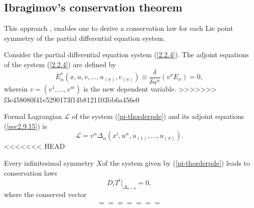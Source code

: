 \begin{defn}
\begin{defn}
\subsection{Ibragimov's conservation theorem}
This approach \citep{ibragimov2009practical}, enables one to derive a conservation law for each Lie point symmetry of the partial differential equation system.

 \begin{defn}  Consider the partial differential equation system (\ref{2.2.4}). The adjoint equations of the system (\ref{2.2.4})  are defined by \begin{equation} E_{\alpha}^{*}( x, u , v, \ldots,u_{(\pi)},v_{(\pi)}) \equiv   \frac{ \delta }{ \delta u^{\alpha }} ( v^{\sigma } E_{\sigma})   =0, \label{2.9.15}
	\end{equation} wherein  $ v= ( v^1, \ldots, v^m)$ is the new dependent variable.
>>>>>>> f3e458080f41e5290173f14b8121103bb6a456e0
\end{defn} 
\begin{defn} Formal Lagrangian $ \mathcal{L}$ of the system (\ref{pi-thorderpde}) and its adjoint equations  (\ref{sec2.9.15}) is \citep{ibragimov2007new} \begin{equation} \mathcal{L} = v^{\alpha} \Delta_{\alpha } ( x^i,u^{\alpha},u_{(1)}, \ldots, u_{(\pi)}). \label{sec2.9.16}
\end{equation}
<<<<<<< HEAD
\end{defn}
\begin{thm} \label{conls} Every infinitesimal symmetry $
X $of the system given by (\ref{pi-thorderpde}) leads to  conservation laws \citep{ibragimov2007new} \begin{equation}
	D_iT^i\Big|_{\Delta_{\alpha =0 }} =0,  \label{sec2.9.18}
	\end{equation} where the conserved vector \begin{align}  \begin{aligned}
=======


\end{aligned}
\end{align}
\end{thm}
\end{defn}
\end{defn}
